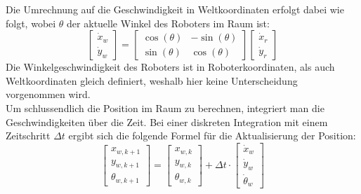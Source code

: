 Die Umrechnung auf die Geschwindigkeit in Weltkoordinaten erfolgt dabei wie folgt, wobei $\theta$ der aktuelle Winkel des Roboters im Raum ist:
\begin{equation}
    \begin{bmatrix}
        \dot{x}_w \\
        \dot{y}_w
    \end{bmatrix}
    =
    \begin{bmatrix}
        \cos(\theta) & -\sin(\theta) \\
        \sin(\theta) & \cos(\theta)
    \end{bmatrix}
    \begin{bmatrix}
        \dot{x}_r \\
        \dot{y}_r    \end{bmatrix}
\end{equation}
Die Winkelgeschwindigkeit des Roboters ist in Roboterkoordinaten, als auch Weltkoordinaten gleich definiert, weshalb hier keine Unterscheidung vorgenommen wird.\\

Um schlussendlich die Position im Raum zu berechnen, integriert man die Geschwindigkeiten über die Zeit. Bei einer diskreten Integration mit einem Zeitschritt $\Delta t$ ergibt sich die folgende Formel für die Aktualisierung der Position:
\begin{equation}
    \begin{bmatrix}
        x_{w, k+1} \\
        y_{w, k+1} \\
        \theta_{w,k+1}
    \end{bmatrix}
    =
    \begin{bmatrix}
        x_{w, k} \\
        y_{w, k} \\
        \theta_{w,k}
    \end{bmatrix} 
    + \Delta t \cdot
    \begin{bmatrix}
        \dot{x}_w \\
        \dot{y}_w \\
        \dot{\theta}_w
    \end{bmatrix}
\end{equation}

